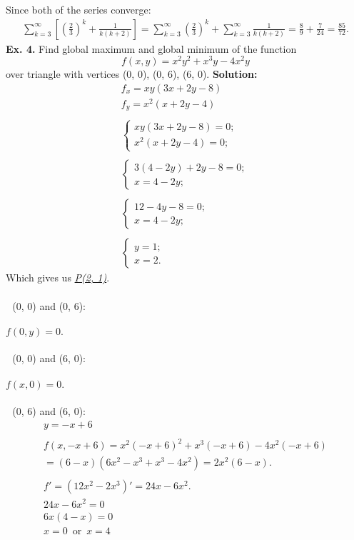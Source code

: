 \documentclass[a4paper, 12pt]{article}
\begin{document}
\bigbreak
Since both of the series converge:
\begin{align*}
\sum_{k=3}^{\infty} \left[(\frac{2}{3})^k + \frac{1}{k(k+2)}\right] = 
\sum_{k=3}^{\infty} (\frac{2}{3})^k + \sum_{k=3}^{\infty} \frac{1}{k(k+2)} = 
\frac{8}{9} + \frac{7}{24} = \frac{85}{72}.
\end{align*}
\newpage
\textbf{Ex. 4.} Find global maximum and global minimum of the function \\
\[ f(x, y) = x^2 y^2 + x^3 y - 4x^2 y \]
over triangle with vertices (0, 0), (0, 6), (6, 0).
\bigbreak
\textbf{Solution:}
\begin{gather*}
f_x = xy(3x + 2y - 8)\\
f_y = x^2(x + 2y - 4)\\\\
\begin{cases}
xy(3x + 2y - 8) = 0;\\
x^2(x+2y - 4) = 0;
\end{cases}\\\\
\begin{cases}
3(4 - 2y) + 2y - 8= 0;\\
x = 4 - 2y;
\end{cases}\\\\
\begin{cases}
12 - 4y -8=0;\\
x = 4-2y;
\end{cases}\\\\
\begin{cases}
y = 1;\\
x = 2.
\end{cases}
\end{gather*}
Which gives us \underline{\emph{P(2, 1)}}.\\\\
 \,\, (0, 0) and (0, 6):\\\\
$f(0, y) = 0.$\\\\
 \,\, (0, 0) and (6, 0):\\\\
$f(x, 0) = 0.$\\\\
\newpage
{} \,\, (0, 6) and (6, 0):
\begin{gather*}
y = -x + 6\\\\
f(x, -x+6) = x^2(-x + 6)^2 + x^3(-x+6) -4x^2(-x+6)\\
= (6 -x)(6x^2 - x^3 +x^3 -4x^2) = 2x^2(6-x).\\\\
f' = (12x^2 - 2x^3)' = 24x - 6x^2.\\
24x - 6x^2 = 0\\
6x(4-x) = 0\\
x = 0 \,\,\, \text{or} \,\,\, x = 4
\end{gather*}
\end{document}
